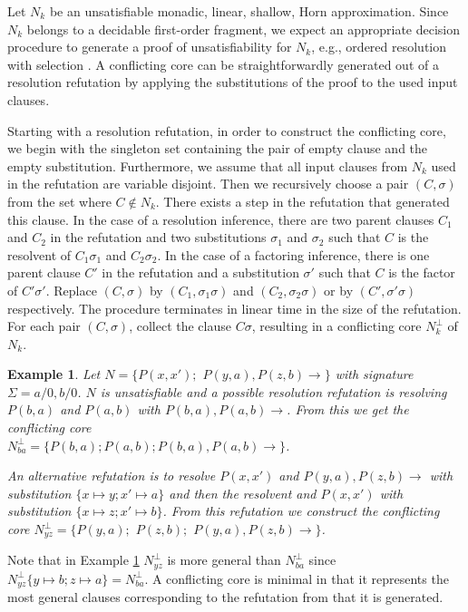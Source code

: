 \documentclass{llncs}
\newcommand{\imp}{\rightarrow}
\newtheorem{exmp}{Example}
\begin{document}
Let $N_k$ be an unsatisfiable monadic, linear, shallow, Horn approximation. 
Since $N_k$ belongs to a decidable first-order fragment,
we expect an appropriate decision procedure to generate a proof of unsatisfiability for $N_k$, 
e.g., ordered resolution with selection \cite{Weidenbach99cade}.
A conflicting core can be straightforwardly generated out of a resolution refutation 
by applying the substitutions of the proof to the used input clauses.

Starting with a resolution refutation, in order to construct the conflicting core, 
we begin with the singleton set containing the pair of empty clause and the empty substitution.
Furthermore, we assume that all input clauses from $N_k$ used in the refutation are
variable disjoint. 
Then we recursively choose a pair $(C,\sigma)$ from the set where $C \notin N_k$.
There exists a step in the refutation that generated this clause. 
In the case of a resolution inference, there are two parent 
clauses $C_1$ and $C_2$ in the refutation and two substitutions $\sigma_1$ and $\sigma_2$
such that $C$ is the resolvent of $C_1\sigma_1$ and $C_2\sigma_2$.
In the case of a factoring inference, there is one parent 
clause $C'$ in the refutation and a substitution $\sigma'$
such that $C$ is the factor of $C'\sigma'$.  
Replace  $(C,\sigma)$ by $(C_1,\sigma_1\sigma)$ and $(C_2,\sigma_2\sigma)$ or 
by $(C',\sigma'\sigma)$ respectively.
The procedure terminates in linear time in the size of the refutation.
For each pair $(C,\sigma)$, collect the clause $C\sigma$, resulting
in a conflicting core $N^\bot_k$ of $N_k$.

\begin{exmp}\label{coreex}
Let $N = \{ P(x,x');$ $P(y,a),P(z,b) \imp \}$ with signature $\Sigma = a/0, b/0$. 
$N$ is unsatisfiable and  a possible resolution refutation is resolving $P(b,a)$ 
and $P(a,b)$ with $P(b,a),P(a,b)\imp$. From this we get the conflicting core \\
$N^\bot_{ba}=\{ P(b,a);P(a,b);P(b,a),P(a,b)\imp\}$.

An alternative refutation is to resolve  $P(x,x')$ and $P(y,a),P(z,b) \imp$ with 
substitution $\{x\mapsto y;x' \mapsto a\}$ 
and then the resolvent and $P(x,x')$ with substitution $\{x\mapsto z;x' \mapsto b\}$. 
From this refutation we construct the conflicting core  
$N^\bot_{yz}=\{ P(y,a);$ $P(z,b);$ $P(y,a),P(z,b)\imp\}$.

\end{exmp} 

Note that in Example \ref{coreex}  $N^\bot_{yz}$ is more general than $N^\bot_{ba}$ since $N^\bot_{yz}\{y \mapsto b; z \mapsto a\} = N^\bot_{ba}$.
A conflicting core is minimal in that it represents the most general clauses corresponding to the refutation from that it is generated.
\end{document}
